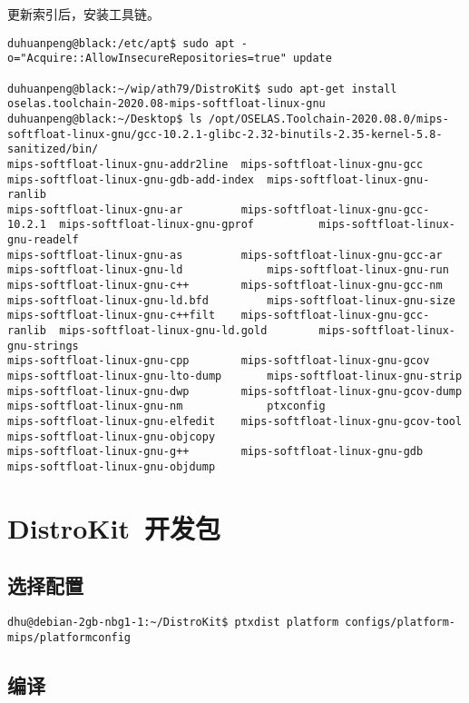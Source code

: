 更新索引后，安装工具链。
\begin{lstlisting} 
duhuanpeng@black:/etc/apt$ sudo apt -o="Acquire::AllowInsecureRepositories=true" update

duhuanpeng@black:~/wip/ath79/DistroKit$ sudo apt-get install oselas.toolchain-2020.08-mips-softfloat-linux-gnu 
duhuanpeng@black:~/Desktop$ ls /opt/OSELAS.Toolchain-2020.08.0/mips-softfloat-linux-gnu/gcc-10.2.1-glibc-2.32-binutils-2.35-kernel-5.8-sanitized/bin/
mips-softfloat-linux-gnu-addr2line  mips-softfloat-linux-gnu-gcc         mips-softfloat-linux-gnu-gdb-add-index  mips-softfloat-linux-gnu-ranlib
mips-softfloat-linux-gnu-ar         mips-softfloat-linux-gnu-gcc-10.2.1  mips-softfloat-linux-gnu-gprof          mips-softfloat-linux-gnu-readelf
mips-softfloat-linux-gnu-as         mips-softfloat-linux-gnu-gcc-ar      mips-softfloat-linux-gnu-ld             mips-softfloat-linux-gnu-run
mips-softfloat-linux-gnu-c++        mips-softfloat-linux-gnu-gcc-nm      mips-softfloat-linux-gnu-ld.bfd         mips-softfloat-linux-gnu-size
mips-softfloat-linux-gnu-c++filt    mips-softfloat-linux-gnu-gcc-ranlib  mips-softfloat-linux-gnu-ld.gold        mips-softfloat-linux-gnu-strings
mips-softfloat-linux-gnu-cpp        mips-softfloat-linux-gnu-gcov        mips-softfloat-linux-gnu-lto-dump       mips-softfloat-linux-gnu-strip
mips-softfloat-linux-gnu-dwp        mips-softfloat-linux-gnu-gcov-dump   mips-softfloat-linux-gnu-nm             ptxconfig
mips-softfloat-linux-gnu-elfedit    mips-softfloat-linux-gnu-gcov-tool   mips-softfloat-linux-gnu-objcopy
mips-softfloat-linux-gnu-g++        mips-softfloat-linux-gnu-gdb         mips-softfloat-linux-gnu-objdump
\end{lstlisting}

\chapter{DistroKit~开发包}

\section{选择配置}

\begin{lstlisting}
dhu@debian-2gb-nbg1-1:~/DistroKit$ ptxdist platform configs/platform-mips/platformconfig 
\end{lstlisting}

\section{编译}

